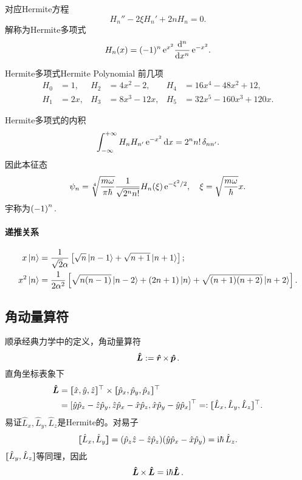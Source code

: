 对应Hermite方程
\[
	H_n''-2\xi H_n'+2nH_n=0.
\]
解称为Hermite多项式
\[
	H_n(x)=(-1)^n\e{x^2}\dd[n]x\e{-x^2}.
\]
\begin{example}{Hermite多项式}{Hermite Polynomial}
	前几项 %
	\begin{align*}
		H_0 & =1,  & H_2 & =4x^2-2,   & H_4 & =16x^4-48x^2+12,    \\
		H_1 & =2x, & H_3 & =8x^3-12x, & H_5 & =32x^5-160x^3+120x.
	\end{align*}
	\iffalse
		\begin{align*}
			\psi_0 & \propto e^{-\xi^2/2}            & \psi_3 & \propto\frac1{\sqrt3}(2\xi^3-3\xi),
			\psi_1 & \propto\sqrt2\xi e^{-\xi^2/2}   & \psi_4 & \propto\frac1{2\sqrt6}(4\xi^4-12\xi^3+3),     \\
			\psi_2 & \propto\frac1{\sqrt2}(2\xi^2-1) & \psi_6 & \propto\frac1{2\sqrt{30}}(4\xi^5-20\xi^3+15).
		\end{align*}
	\fi
\end{example}
Hermite多项式的内积
\[
	\int\iti H_nH_{n'}\e{-x^2}\d x=2^nn!\,\delta_{nn'}.
\]
因此本征态
\begin{align}
	\psi_n=\sqrt[4]{\frac{m\omega}{\pi\hbar}}\frac1{\sqrt{2^nn!}}H_n(\xi)\e{-\xi^2/2},\quad\xi=\sqrt{\frac{m\omega}\hbar}x.
\end{align}
宇称为$\kh{-1}^n.$
\paragraph*{递推关系}
{\small\begin{align}
	x\ket n&=\frac1{\sqrt2\alpha}\fkh{\sqrt n\ket{n-1}+\sqrt{n+1}\ket{n+1}};\\
	x^2\ket n&%
	=\frac1{2\alpha^2}\fkh{\sqrt{n(n-1)}\ket{n-2}+(2n+1)\ket n+\sqrt{(n+1)(n+2)}\ket{n+2}}.
\end{align}}
\subsection{角动量算符}
顺承经典力学中的定义，角动量算符
\[
	\qo L:=\qo r\times\,\qo p.
\]
直角坐标表象下
\begin{align*}
	\qo L & =\zkh{\hat x,\hat y,\hat z}\tp\times\zkh{\hat p_x,\hat p_y,\hat p_z}\tp                             \\
	      & =\fkh{\hat y\hat p_z-\hat z\hat p_y,\hat z\hat p_x-\hat x\hat p_z,\hat x\hat p_y-\hat y\hat p_x}\tp %
	=:\zkh{\hat L_x,\hat L_y,\hat L_z}\tp.
\end{align*}
易证$\hat L_x,\hat L_y,\hat L_z$是Hermite的。对易子
\[
	\cmm{L_x}{L_y}=(\hat p_z\hat z-\hat z\hat p_z)(\hat y\hat p_x-\hat x\hat p_y)=\i\hbar\,\hat L_z.
\]
$\cmm{L_y}{L_z}$等同理，因此
\begin{align}
	\qo L\times\,\qo L=\i\hbar\qo L.
\end{align}

